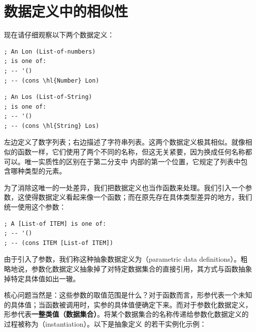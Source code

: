 \section{数据定义中的相似性}
\label{sec:14_3}

现在请仔细观察以下两个数据定义：

\begin{stepperbox}
  \noindent\begin{minipage}[t]{0.48\linewidth}\vspace{0pt}
\begin{Verbatim}[commandchars=\\\{\}, fontsize=\fontsize{6.0pt}{7.2pt}\selectfont]
; An Lon (List-of-numbers)
; is one of:
; -- '()
; -- (cons \hl{Number} Lon)
\end{Verbatim}
  \end{minipage}\hfill
  \begin{minipage}[t]{0.48\linewidth}\vspace{0pt}
\begin{Verbatim}[commandchars=\\\{\}, fontsize=\fontsize{6.0pt}{7.2pt}\selectfont]
; An Los (List-of-String)
; is one of:
; -- '()
; -- (cons \hl{String} Los)
\end{Verbatim}
  \end{minipage}
\end{stepperbox}

左边定义了数字列表；右边描述了字符串列表。这两个数据定义极其相似。就像相似的函数一样，它们使用了两个不同的名称，但这无关紧要，因为换成任何名称都可以。唯一实质性的区别在于第二分支中  内部的第一个位置，它规定了列表中包含哪种类型的元素。

为了消除这唯一的一处差异，我们把数据定义也当作函数来处理。我们引入一个参数，这使得数据定义看起来像一个函数；而在原先存在具体类型差异的地方，我们统一使用这个参数：

\begin{lstlisting}[language=BSL]
; A [List-of ITEM] is one of:
; -- '()
; -- (cons ITEM [List-of ITEM])
\end{lstlisting}

由于引入了参数，我们称这种抽象数据定义为（parametric data definitions）。粗略地说，参数化数据定义抽象掉了对特定数据集合的直接引用，其方式与函数抽象掉特定具体值如出一辙。

核心问题当然是：这些参数的取值范围是什么？对于函数而言，形参代表一个未知的具体值；当函数被调用时，实参的具体值便确定下来。而对于参数化数据定义，形参代表\textbf{一整类值（数据集合）}。将某个数据集合的名称传递给参数化数据定义的过程被称为（instantiation）。以下是抽象定义  的若干实例化示例：

